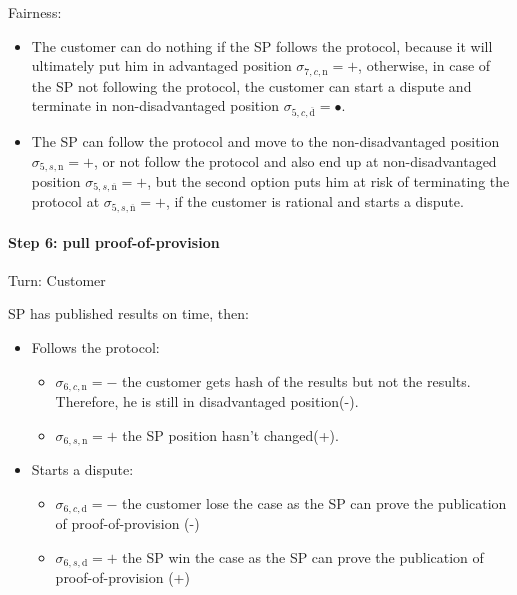 \documentclass{ieeeaccess}
\begin{document}
Fairness:

\begin{itemize}

\item
  The customer can do nothing if the SP follows the protocol, because it
  will ultimately put him in advantaged position
  \(\sigma_{7, c, \mathrm{n}} = +\), otherwise, in case of the SP not
  following the protocol, the customer can start a dispute and terminate
  in non-disadvantaged position
  \(\sigma_{5, c, \overline{\mathrm{d}}} = •\).
\item
  The SP can follow the protocol and move to the non-disadvantaged
  position \(\sigma_{5, s, \mathrm{n}} = +\), or not follow the protocol
  and also end up at non-disadvantaged position
  \(\sigma_{5, s, \overline{\mathrm{n}}} = +\), but the second option
  puts him at risk of terminating the protocol at
  \(\sigma_{5, s, \overline{\mathrm{n}}} = +\), if the customer is
  rational and starts a dispute.
\end{itemize}


\paragraph{Step 6: pull
proof-of-provision}\label{step-6-pull-proof-of-provision}

Turn: Customer

SP has published results on time, then:

\begin{itemize}
\item
  Follows the protocol:

  \begin{itemize}
  
  \item
    \(\sigma_{6, c, \mathrm{n}} = -\) the customer gets hash of the
    results but not the results. Therefore, he is still in disadvantaged
    position(-).
  \item
    \(\sigma_{6, s, \mathrm{n}} = +\) the SP position hasn't changed(+).
  \end{itemize}
\item
  Starts a dispute:

  \begin{itemize}
  
  \item
    \(\sigma_{6, c, \mathrm{d}} = -\) the customer lose the case as the
    SP can prove the publication of proof-of-provision (-)
  \item
    \(\sigma_{6, s, \mathrm{d}} = +\) the SP win the case as the SP can
    prove the publication of proof-of-provision (+)
  \end{itemize}
\end{itemize}
\end{document}
